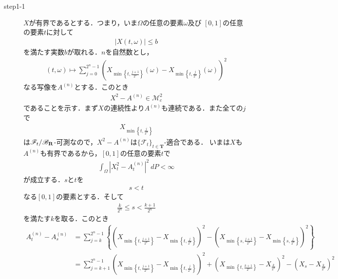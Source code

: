 	\begin{sketch}\mbox{}
		\begin{description}
			\item[step1-1] $X$が有界であるとする．つまり，いま$\Omega$の任意の要素$\omega$及び
				$[0,1]$の任意の要素$t$に対して
				\begin{align}
					|X(t,\omega)| \leq b
				\end{align}
				を満たす実数$b$が取れる．$n$を自然数とし，
				\begin{align}
					(t,\omega) \longmapsto \sum_{j=0}^{2^n-1} \left(X_{\min\left\{t,\frac{j+1}{2^n}\right\}}(\omega)
					- X_{\min\left\{t,\frac{j}{2^n}\right\}}(\omega)\right)^2
				\end{align}
				なる写像を$A^{(n)}$とする．このとき
				\begin{align}
					X^2 - A^{(n)} \in \mathscr{M}_{c}^{2}
					\label{fom:thm_decomposition_of_square_integrable_martingales_2}
				\end{align}
				であることを示す．まず$X$の連続性より$A^{(n)}$も連続である．また全ての$j$で
				\begin{align}
					X_{\min\left\{t,\frac{j}{2^n}\right\}}
				\end{align}
				は$\mathscr{F}_t/\mathscr{B}_{\mathbf{R}}$-可測なので，$X^2-A^{(n)}$は$\{\mathscr{F}_t\}_{t \in \mathbf{T}}$-適合である．
				いまは$X$も$A^{(n)}$も有界であるから，$[0,1]$の任意の要素$t$で
				\begin{align}
					\int_{\Omega} \left|X_t^2-A_t^{(n)}\right|^2\ dP < \infty
				\end{align}
				が成立する．$s$と$t$を
				\begin{align}
					s < t
				\end{align}
				なる$[0,1]$の要素とする．そして
				\begin{align}
					\frac{k}{2^n} \leq s < \frac{k+1}{2^n}
				\end{align}
				を満たす$k$を取る．このとき
				\begin{align}
					A^{(n)}_t - A^{(n)}_s
					&= \sum_{j=k}^{2^n-1} \left\{
					\left(X_{\min\left\{t,\frac{j+1}{2^n}\right\}} - X_{\min\left\{t,\frac{j}{2^n}\right\}}\right)^2
					- \left(X_{\min\left\{s,\frac{j+1}{2^n}\right\}} - X_{\min\left\{s,\frac{j}{2^n}\right\}}\right)^2\right\} \\
					&= \sum_{j=k+1}^{2^n-1} \left(X_{\min\left\{t,\frac{j+1}{2^n}\right\}} - X_{\min\left\{t,\frac{j}{2^n}\right\}}\right)^2
					+ \left(X_{\min\left\{t,\frac{k+1}{2^n}\right\}} - X_{\frac{k}{2^n}}\right)^2
					- \left(X_s - X_{\frac{k}{2^n}}\right)^2

\end{align}
\end{description}
\end{sketch}
